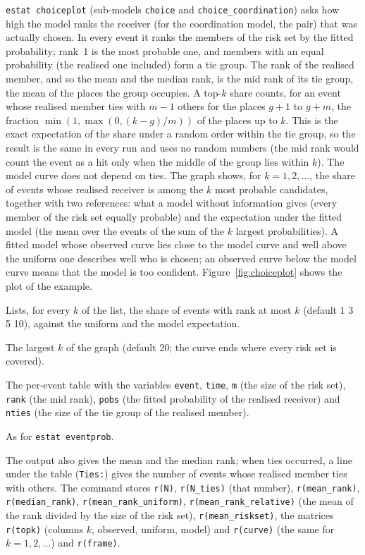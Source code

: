 \texttt{estat choiceplot} (sub-models \texttt{choice} and \texttt{choice\_coordination}) asks how high the model ranks the receiver (for the coordination model, the pair) that was actually chosen. In every event it ranks the members of the risk set by the fitted probability; rank~1 is the most probable one, and members with an equal probability (the realised one included) form a tie group. The rank of the realised member, and so the mean and the median rank, is the mid rank of its tie group, the mean of the places the group occupies. A top-$k$ share counts, for an event whose realised member ties with $m-1$ others for the places $g+1$ to $g+m$, the fraction $\min(1,\max(0,(k-g)/m))$ of the places up to $k$. This is the exact expectation of the share under a random order within the tie group, so the result is the same in every run and uses no random numbers (the mid rank would count the event as a hit only when the middle of the group lies within $k$). The model curve does not depend on ties. The graph shows, for $k=1,2,\dots$, the share of events whose realised receiver is among the $k$ most probable candidates, together with two references: what a model without information gives (every member of the risk set equally probable) and the expectation under the fitted model (the mean over the events of the sum of the $k$ largest probabilities). A fitted model whose observed curve lies close to the model curve and well above the uniform one describes well who is chosen; an observed curve below the model curve means that the model is too confident. Figure~\ref{fig:choiceplot} shows the plot of the example.
\begin{description}[style=nextline,nosep]
  \item[\opt{topk(numlist)}] Lists, for every $k$ of the list, the share of events with rank at most $k$ (default 1 3 5 10), against the uniform and the model expectation.
  \item[\opt{maxrank(\#)}] The largest $k$ of the graph (default 20; the curve ends where every risk set is covered).
  \item[\opt{frame(name)}, \opt{replace}] The per-event table with the variables \texttt{event}, \texttt{time}, \texttt{m} (the size of the risk set), \texttt{rank} (the mid rank), \texttt{pobs} (the fitted probability of the realised receiver) and \texttt{nties} (the size of the tie group of the realised member).
  \item[\opt{maxrows(\#)}] As for \texttt{estat eventprob}.
\end{description}
The output also gives the mean and the median rank; when ties occurred, a line under the table (\texttt{Ties:}) gives the number of events whose realised member ties with others. The command stores \texttt{r(N)}, \texttt{r(N\_ties)} (that number), \texttt{r(mean\_rank)}, \texttt{r(median\_rank)}, \texttt{r(mean\_rank\_uniform)}, \texttt{r(mean\_rank\_relative)} (the mean of the rank divided by the size of the risk set), \texttt{r(mean\_riskset)}, the matrices \texttt{r(topk)} (columns $k$, observed, uniform, model) and \texttt{r(curve)} (the same for $k=1,2,\dots$) and \texttt{r(frame)}.
